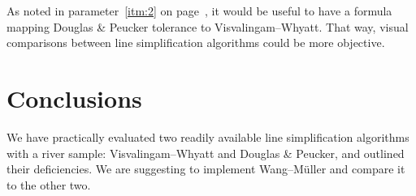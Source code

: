 \documentclass[a4paper]{article}
\newcommand{\DP}{Douglas \& Peucker}
\newcommand{\VW}{Visvalingam--Whyatt}
\newcommand{\WM}{Wang--M{\"u}ller}
\begin{document}
As noted in parameter~\ref{itm:2} on page~\pageref{itm:2}, it would be useful
to have a formula mapping {\DP} tolerance to {\VW}. That way, visual
comparisons between line simplification algorithms could be more objective.

\section{Conclusions}
\label{sec:conclusions}

We have practically evaluated two readily available line simplification
algorithms with a river sample: {\VW} and {\DP}, and outlined their
deficiencies. We are suggesting to implement {\WM} and compare it to the other
two.

\printbibliography

\end{document}
